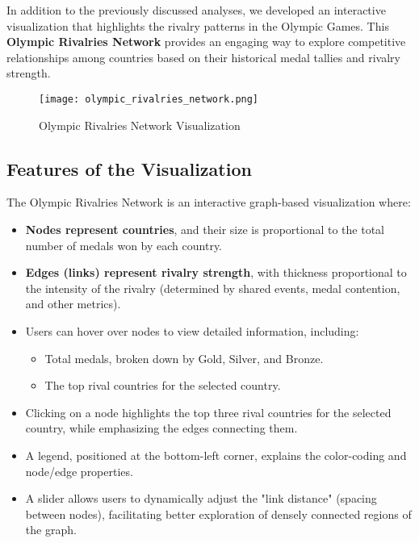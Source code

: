 In addition to the previously discussed analyses, we developed an interactive visualization that highlights the rivalry patterns in the Olympic Games. This \textbf{Olympic Rivalries Network} provides an engaging way to explore competitive relationships among countries based on their historical medal tallies and rivalry strength.

\begin{figure}[ht]
    \centering
    \texttt{[image: olympic\_rivalries\_network.png]}
    \caption{Olympic Rivalries Network Visualization}
    \label{fig:olympic_rivalries_network}
\end{figure}

\subsection{Features of the Visualization}
The Olympic Rivalries Network is an interactive graph-based visualization where:
\begin{itemize}
    \item \textbf{Nodes represent countries}, and their size is proportional to the total number of medals won by each country.
    \item \textbf{Edges (links) represent rivalry strength}, with thickness proportional to the intensity of the rivalry (determined by shared events, medal contention, and other metrics).
    \item Users can hover over nodes to view detailed information, including:
    \begin{itemize}
        \item Total medals, broken down by Gold, Silver, and Bronze.
        \item The top rival countries for the selected country.
    \end{itemize}
    \item Clicking on a node highlights the top three rival countries for the selected country, while emphasizing the edges connecting them.
    \item A legend, positioned at the bottom-left corner, explains the color-coding and node/edge properties.
    \item A slider allows users to dynamically adjust the "link distance" (spacing between nodes), facilitating better exploration of densely connected regions of the graph.
\end{itemize}


